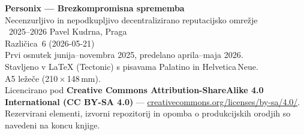 \thispagestyle{empty}
\ifdefined\printmode\vspace*{\fill}\else{}\fi
\begin{flushleft}\small\sffamily
\textbf{Personix --- Brezkompromisna sprememba}\\[0.3em]
Necenzurljivo in nepodkupljivo decentralizirano reputacijsko omrežje\\[1.4em]

\textcopyright\ 2025--2026 Pavel Kudrna, Praga\\[0.4em]

Različica~6 (2026-05-21)\\
Prvi osnutek junija--novembra 2025, predelano aprila--maja 2026.\\[1.4em]

Stavljeno v \LaTeX{} (Tectonic) s pisavama Palatino in Helvetica\,Neue.\\
A5 ležeče (210\,$\times$\,148\,mm).\\[1.4em]

Licencirano pod \textbf{Creative Commons Attribution-ShareAlike 4.0
International (CC BY-SA 4.0)} ---
\href{https://creativecommons.org/licenses/by-sa/4.0/}{creativecommons.org/licenses/by-sa/4.0/}.
Rezervirani elementi, izvorni repozitorij in opomba o produkcijskih orodjih
so navedeni na koncu knjige.
\end{flushleft}
\ifdefined\printmode\else{}\fi
\clearpage
